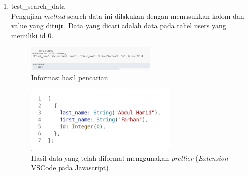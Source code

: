 \begin{enumerate}
	\item test\_search\_data \\
  Pengujian \emph{method} search data ini dilakukan dengan memasukkan kolom dan value yang dituju. Data yang dicari adalah data pada tabel users yang memiliki id 0.
  \begin{figure}[H]
  	\centering{}
	\includegraphics[width=0.6\textwidth]{gambar/bab4/test-search-data-users.png}
  	\caption{Informasi hasil pencarian}
   \end{figure}
    \begin{figure}[H]
  	\centering{}
	\includegraphics[width=0.7\textwidth]{gambar/bab4/test-search-data-users-beautify.png}
  	\caption{Hasil data yang telah diformat menggunakan \emph{prettier} (\emph{Extension} VSCode pada Javascript)}
   \end{figure}
  

\end{enumerate}
